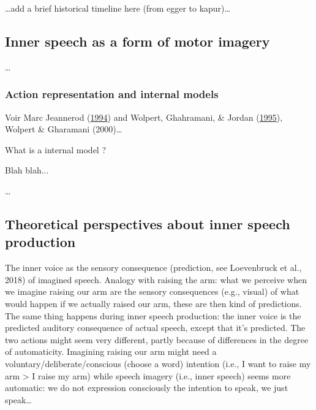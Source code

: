 \documentclass[a4paper,12pt,twoside,openright,oldfontcommands]{memoir}
\begin{document}
\ldots{}add a brief historical timeline here (from egger to
kapur)\ldots{}

\subsection{Inner speech as a form of motor
imagery}\label{inner-speech-as-a-form-of-motor-imagery}

\ldots{}

\subsubsection{Action representation and internal
models}\label{action-representation-and-internal-models}

Voir Marc Jeannerod
(\protect\hyperlink{ref-jeannerod_representing_1994}{1994}) and Wolpert,
Ghahramani, \& Jordan
(\protect\hyperlink{ref-wolpert_internal_1995}{1995}), Wolpert \&
Gharamani (2000)\ldots{}

\begin{mybox}[label = IM]{What is a internal model ?}

Blah blah...

\end{mybox}

\ldots{}

\subsection{Theoretical perspectives about inner speech
production}\label{theoretical-perspectives-about-inner-speech-production}

The inner voice as the sensory consequence (prediction, see Loevenbruck
et al., 2018) of imagined speech. Analogy with raising the arm: what we
perceive when we imagine raising our arm are the sensory consequences
(e.g., visual) of what would happen if we actually raised our arm, these
are then kind of predictions. The same thing happens during inner speech
production: the inner voice is the predicted auditory consequence of
actual speech, except that it's predicted. The two actions might seem
very different, partly because of differences in the degree of
automaticity. Imagining raising our arm might need a
voluntary/deliberate/conscious (choose a word) intention (i.e., I want
to raise my arm \textgreater{} I raise my arm) while speech imagery
(i.e., inner speech) seems more automatic: we do not expression
consciously the intention to speak, we just speak\ldots{}
\end{document}
